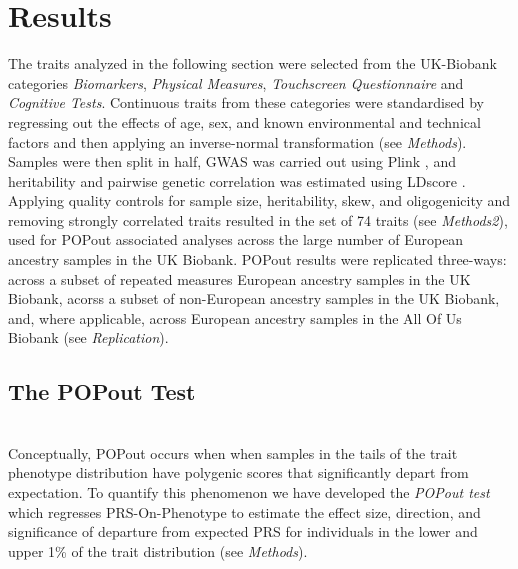 \documentclass[times]{zHenriquesLab-StyleBioRxiv}
\begin{document}
\section*{Results} \label{sec:results} 
The traits analyzed in the following section were selected 
from the UK-Biobank categories \textit{Biomarkers}, \textit{Physical Measures}, 
\textit{Touchscreen Questionnaire} and  \textit{Cognitive Tests}.  
Continuous traits from these categories were standardised by regressing 
out the effects of age, sex, and known environmental and technical factors 
and then applying an inverse-normal transformation (see \textit{Methods}).  
Samples were then split in half, GWAS was carried out using Plink \cite{bt_10}, 
and heritability and pairwise genetic correlation was estimated using LDscore \cite{ldsc}.
Applying quality controls for sample size, heritability, skew, and oligogenicity and 
removing strongly correlated traits resulted in the set of 74 traits (see \textit{Methods2}), 
used for POPout associated analyses across the large number of European 
ancestry samples in the UK Biobank. POPout results were replicated three-ways: 
across a subset of repeated measures European ancestry samples in the UK Biobank, 
acorss a subset of non-European ancestry samples in the UK Biobank, and, where applicable, 
across European ancestry samples in the All Of Us Biobank (see \textit{Replication}).



\subsection*{The POPout Test} ~\\ 

Conceptually, POPout occurs when when samples in the tails of the trait phenotype 
distribution have polygenic scores that significantly depart from expectation.  
To quantify this phenomenon we have developed the \textit{POPout test} which regresses
PRS-On-Phenotype to estimate the effect size, direction, and significance of departure from expected PRS 
for individuals in the lower and upper 1\% of the trait distribution (see \textit{Methods}).  

\end{document}
